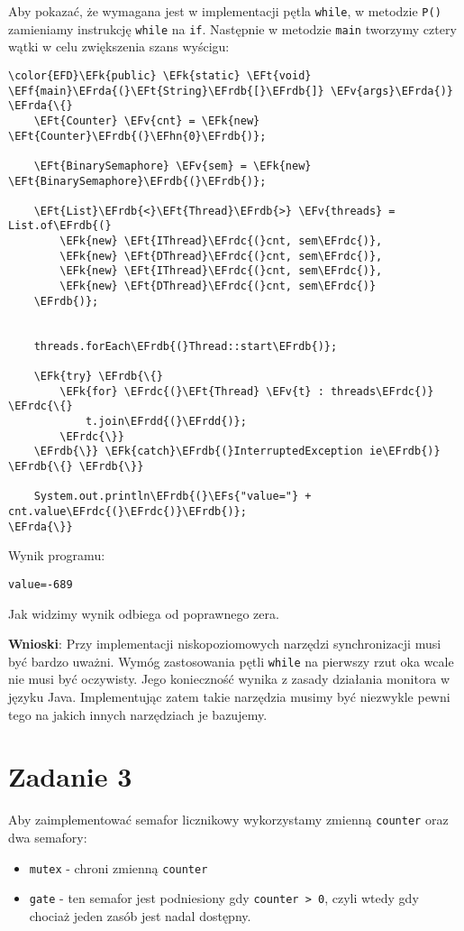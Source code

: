 \documentclass[11pt]{article}
\newcommand{\EFs}[1]{\textcolor{EFs}{#1}} %
\newcommand{\EFk}[1]{\textcolor{EFk}{#1}} %
\newcommand{\EFf}[1]{\textcolor{EFf}{#1}} %
\newcommand{\EFv}[1]{\textcolor{EFv}{#1}} %
\newcommand{\EFt}[1]{\textcolor{EFt}{#1}} %
\newcommand{\EFhn}[1]{\textcolor{EFhn}{#1}} %
\newcommand{\EFrda}[1]{#1} %
\newcommand{\EFrdb}[1]{\textcolor{EFrdb}{#1}} %
\newcommand{\EFrdc}[1]{\textcolor{EFrdc}{#1}} %
\newcommand{\EFrdd}[1]{\textcolor{EFrdd}{#1}} %
\begin{document}
Aby pokazać, że wymagana jest w implementacji pętla \texttt{while}, w metodzie \texttt{P()}
zamieniamy instrukcję \texttt{while} na \texttt{if}.
Następnie w metodzie \texttt{main} tworzymy cztery wątki w celu zwiększenia szans wyścigu:
\begin{Code}
\begin{Verbatim}
\color{EFD}\EFk{public} \EFk{static} \EFt{void} \EFf{main}\EFrda{(}\EFt{String}\EFrdb{[}\EFrdb{]} \EFv{args}\EFrda{)} \EFrda{\{}
    \EFt{Counter} \EFv{cnt} = \EFk{new} \EFt{Counter}\EFrdb{(}\EFhn{0}\EFrdb{)};

    \EFt{BinarySemaphore} \EFv{sem} = \EFk{new} \EFt{BinarySemaphore}\EFrdb{(}\EFrdb{)};

    \EFt{List}\EFrdb{<}\EFt{Thread}\EFrdb{>} \EFv{threads} = List.of\EFrdb{(}
        \EFk{new} \EFt{IThread}\EFrdc{(}cnt, sem\EFrdc{)},
        \EFk{new} \EFt{DThread}\EFrdc{(}cnt, sem\EFrdc{)},
        \EFk{new} \EFt{IThread}\EFrdc{(}cnt, sem\EFrdc{)},
        \EFk{new} \EFt{DThread}\EFrdc{(}cnt, sem\EFrdc{)}
    \EFrdb{)};


    threads.forEach\EFrdb{(}Thread::start\EFrdb{)};

    \EFk{try} \EFrdb{\{}
        \EFk{for} \EFrdc{(}\EFt{Thread} \EFv{t} : threads\EFrdc{)} \EFrdc{\{}
            t.join\EFrdd{(}\EFrdd{)};
        \EFrdc{\}}
    \EFrdb{\}} \EFk{catch}\EFrdb{(}InterruptedException ie\EFrdb{)} \EFrdb{\{} \EFrdb{\}}

    System.out.println\EFrdb{(}\EFs{"value="} + cnt.value\EFrdc{(}\EFrdc{)}\EFrdb{)};
\EFrda{\}}
\end{Verbatim}
\end{Code}

Wynik programu:
\begin{tcolorbox}
\begin{Verbatim}
value=-689
\end{Verbatim}


\end{tcolorbox}Jak widzimy wynik odbiega od poprawnego zera.

\textbf{Wnioski}: Przy implementacji niskopoziomowych narzędzi synchronizacji musi być
bardzo uważni. Wymóg zastosowania pętli \texttt{while} na pierwszy rzut oka wcale nie musi być
oczywisty. Jego konieczność wynika z zasady działania monitora w języku Java.
Implementując zatem takie narzędzia musimy być niezwykle pewni tego na
jakich innych narzędziach je bazujemy.
\section*{Zadanie 3}
\label{sec:org234408c}
Aby zaimplementować semafor licznikowy wykorzystamy zmienną \texttt{counter} oraz dwa semafory:
\begin{itemize}
\item \texttt{mutex} - chroni zmienną \texttt{counter}
\item \texttt{gate} - ten semafor jest podniesiony gdy \texttt{counter > 0}, czyli wtedy
gdy chociaż jeden zasób jest nadal dostępny.
\end{itemize}
\end{document}
